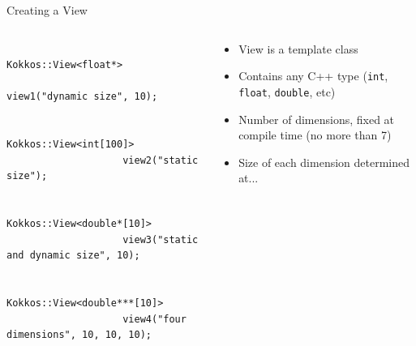 \documentclass[
    aspectratio=169,
    handout,
]{beamer}
\begin{document}
\begin{frame}[fragile]{Creating a View}
    \begin{columns}
        \begin{column}{0.6\linewidth}
            \begin{verbatim}
                Kokkos::View<float*>
                    view1("dynamic size", 10);

                Kokkos::View<int[100]>
                    view2("static size");

                Kokkos::View<double*[10]>
                    view3("static and dynamic size", 10);

                Kokkos::View<double***[10]>
                    view4("four dimensions", 10, 10, 10);
            \end{verbatim}
        \end{column}
        \begin{column}{0.4\linewidth}
            \begin{itemize}
                \item View is a template class
                \item Contains any C++ type (\texttt{int}, \texttt{float}, \texttt{double}, etc)
                \item Number of dimensions, fixed at compile time (no more than 7)
                \item Size of each dimension determined at...
            \end{itemize}
        \end{column}
    \end{columns}
\end{frame}

\end{document}
